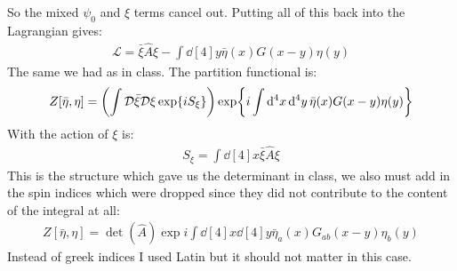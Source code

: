 \documentclass[12pt]{article}
\renewcommand{\L}{\mathcal{L}}
\newcommand{\cD}{\mathcal{D}}
\newcommand{\etab}{\bar{\eta}}
\newcommand{\xib}{\bar{\xi}}
\newcommand{\A}{\hat{A}}
\begin{document}
So the mixed $\psi_0$ and $\xi$ terms cancel out. Putting all of this back into the Lagrangian gives:
\begin{align*}
  \L=\xib\A\xi-\int\dd[4]{y}\etab(x)G(x-y)\eta(y)
\end{align*}
The same we had as in class. The partition functional is:
\begin{align*}
  Z[\etab,\eta]=\qty(\int\cD\xib\cD\xi\exp{iS_\xi})
  \exp{i\int\dd[4]{x}\dd[4]{y}\etab(x)G(x-y)\eta(y)}
\end{align*}
With the action of $\xi$ is:
\begin{align*}
  S_\xi=\int\dd[4]{x}\xib\A\xi
\end{align*}
This is the structure which gave us the determinant in class, we also must add in the spin indices which were dropped since they did not contribute to the content of the integral at all:
\begin{align*}
  Z[\etab,\eta]=\det(\A)
  \exp{i\int\dd[4]{x}\dd[4]{y}\etab_a(x)G_{ab}(x-y)\eta_b(y)}
\end{align*}
Instead of greek indices I used Latin but it should not matter in this case. 
\end{document}

